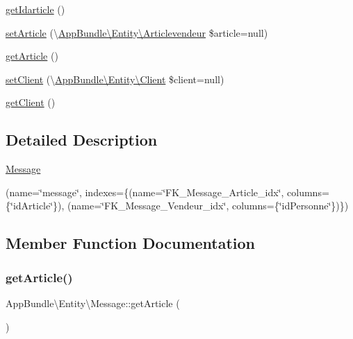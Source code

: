 \begin{DoxyCompactItemize}
\item 
\hyperlink{class_app_bundle_1_1_entity_1_1_message_aef5975d1d4eb60e8e503590ec602349e}{get\+Idarticle} ()
\item 
\hyperlink{class_app_bundle_1_1_entity_1_1_message_af110feafae364e649531a72a23d84bd1}{set\+Article} (\textbackslash{}\hyperlink{class_app_bundle_1_1_entity_1_1_articlevendeur}{App\+Bundle\textbackslash{}\+Entity\textbackslash{}\+Articlevendeur} \$article=null)
\item 
\hyperlink{class_app_bundle_1_1_entity_1_1_message_a49b3bfe53d57a294ffa1ca722846ee6e}{get\+Article} ()
\item 
\hyperlink{class_app_bundle_1_1_entity_1_1_message_a29977689cfcc1540717e0a66503f0500}{set\+Client} (\textbackslash{}\hyperlink{class_app_bundle_1_1_entity_1_1_client}{App\+Bundle\textbackslash{}\+Entity\textbackslash{}\+Client} \$client=null)
\item 
\hyperlink{class_app_bundle_1_1_entity_1_1_message_add71d633ee09479285ca4b496ea8ce84}{get\+Client} ()
\end{DoxyCompactItemize}


\subsection{Detailed Description}
\hyperlink{class_app_bundle_1_1_entity_1_1_message}{Message}

(name=\char`\"{}message\char`\"{}, indexes=\{(name=\char`\"{}\+F\+K\+\_\+\+Message\+\_\+\+Article\+\_\+idx\char`\"{}, columns=\{\char`\"{}id\+Article\char`\"{}\}), (name=\char`\"{}\+F\+K\+\_\+\+Message\+\_\+\+Vendeur\+\_\+idx\char`\"{}, columns=\{\char`\"{}id\+Personne\char`\"{}\})\})  

\subsection{Member Function Documentation}
\mbox{\label{class_app_bundle_1_1_entity_1_1_message_a49b3bfe53d57a294ffa1ca722846ee6e}} 
\subsubsection{\texorpdfstring{get\+Article()}{getArticle()}}
{\footnotesize\ttfamily App\+Bundle\textbackslash{}\+Entity\textbackslash{}\+Message\+::get\+Article (\begin{DoxyParamCaption}{ }\end{DoxyParamCaption})}

